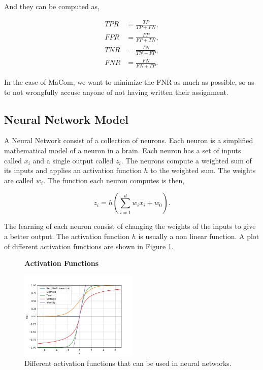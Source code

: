 And they can be computed as,

\begin{align}
    TPR &= \frac{TP}{TP + FN}, \\
    FPR &= \frac{FP}{FP + TN}, \\
    TNR &= \frac{TN}{TN + FP}, \\
    FNR &= \frac{FN}{FN + TP}.
\end{align}

In the case of MaCom, we want to minimize the \gls{FNR} as much as possible, so
as to not wrongfully accuse anyone of not having written their assignment.


\subsection{Neural Network Model}

A Neural Network consist of a collection of neurons. Each neuron is a simplified
mathematical model of a neuron in a brain. Each neuron has a set of inputs
called $x_i$ and a single output called $z_i$. The neurons compute a weighted
sum of its inputs and applies an activation function $h$ to the weighted sum.
The weights are called $w_i$. The function each neuron computes is then,

\begin{equation}
    z_i = h\left(
        \sum_{i = 1}^d w_ix_i + w_0
    \right).
\end{equation}

The learning of each neuron consist of changing the weights of the inputs to
give a better output. The activation function $h$ is usually a non linear
function. A plot of different activation functions are shown in Figure
\ref{fig:activation_functions}.

\begin{figure}
    \centering
    \textbf{Activation Functions}\par\medskip
    \includegraphics[width=0.5\textwidth]{./pictures/method/activation_functions.png}
    \caption{Different activation functions that can be used in neural
        networks.}
    \label{fig:activation_functions}
\end{figure}


